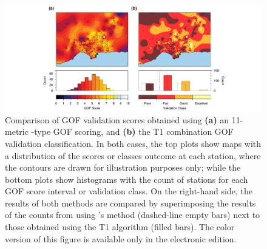\begin{figure}[th!]
	\centering
	\includegraphics[width=\textwidth]{figures/pdf/figure-11}
	\caption{Comparison of GOF validation scores obtained using \textbf{(a)} an 11-metric \citet{Anderson_2004_Proc}-type GOF scoring, and \textbf{(b)} the T1 combination GOF validation classification. In both cases, the top plots show maps with a distribution of the scores or classes outcome at each station, where the contours are drawn for illustration purposes only; while the bottom plots show histograms with the count of stations for each GOF score interval or validation class. On the right-hand side, the results of both methods are compared by superimposing the results of the counts from using \citeauthor{Anderson_2004_Proc}'s method (dashed-line empty bars) next to those obtained using the T1 algorithm (filled bars). The color version of this figure is available only in the electronic edition.}
	\label{fig:avg-gof-maps}
\end{figure}

